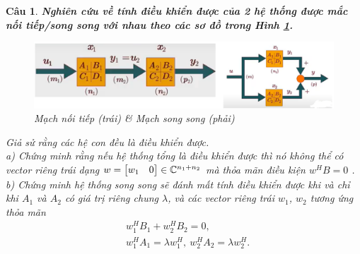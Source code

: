 \documentclass[11pt]{article}
\newtheorem{bt}{Câu}
\begin{document}
\begin{bt} \textbf{Nghiên cứu về tính điều khiển được của 2 hệ thống được mắc nối tiếp/song song với nhau theo các sơ đồ trong Hình \ref{fig:electricalconnection}.} \\
	
	\begin{figure}[!h]
		\centering
		\includegraphics[scale = 0.6]{Figures/Electrical_connection}
		\caption{Mạch nối tiếp (trái) \& Mạch song song (phải)}
		\label{fig:electricalconnection}
	\end{figure}
	
	\noindent Giả sử rằng các hệ con đều là điều khiển được. \\
	a) Chứng minh rằng nếu hệ thống tổng là điều khiển được thì nó không thể có vector riêng trái dạng $w = \begin{bmatrix} w_1 & 0 \end{bmatrix} \in \mathbb{C}^{n_1+n_2}$ mà thỏa mãn điều kiện $w^H B= 0$ . \\
	b) Chứng minh hệ thống song song sẽ đánh mất tính điều khiển được khi và chỉ khi $A_1$ và $A_2$ có giá trị riêng chung $\lambda$, và các vector riêng trái $w_1$, $w_2$ tương ứng thỏa mãn
	\begin{align*}
		& w^H_1 B_1 + w^H_2 B_2 = 0, \\
		& w^H_1 A_1 = \lambda w^H_1,   \   w^H_2 A_2 = \lambda w^H_2.
	\end{align*}
\end{bt}
\end{document}
